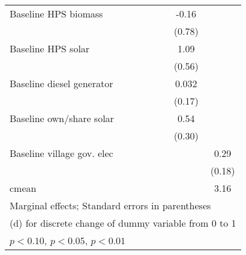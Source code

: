 \begin{table}[htbp]
\begin{tabular*}{1\hsize}{@{\hskip\tabcolsep\extracolsep\fill}l*{6}{c}}
Baseline HPS biomass&                  &                  &                  &                  &    -0.16         &                  \\
                &                  &                  &                  &                  &   (0.78)         &                  \\
Baseline HPS solar&                  &                  &                  &                  &     1.09\sym{*}  &                  \\
                &                  &                  &                  &                  &   (0.56)         &                  \\
Baseline diesel generator&                  &                  &                  &                  &    0.032         &                  \\
                &                  &                  &                  &                  &   (0.17)         &                  \\
Baseline own/share solar&                  &                  &                  &                  &     0.54\sym{*}  &                  \\
                &                  &                  &                  &                  &   (0.30)         &                  \\
Baseline village gov. elec&                  &                  &                  &                  &                  &     0.29         \\
                &                  &                  &                  &                  &                  &   (0.18)         \\
\midrule
cmean           &                  &                  &                  &                  &                  &     3.16         \\
\bottomrule
\multicolumn{7}{l}{\footnotesize Marginal effects; Standard errors in parentheses}\\
\multicolumn{7}{l}{\footnotesize  (d) for discrete change of dummy variable from 0 to 1}\\
\multicolumn{7}{l}{\footnotesize \sym{*} \(p<0.10\), \sym{**} \(p<0.05\), \sym{***} \(p<0.01\)}\\
\end{tabular*}
\end{table}
